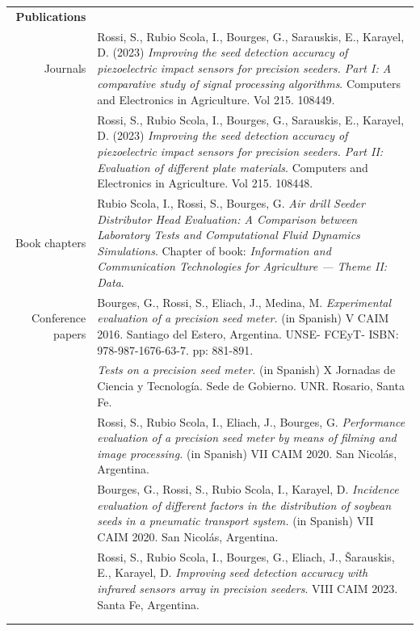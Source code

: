 \documentclass[a4paper,10pt, sans]{article}
\begin{document}
\begin{table}[H]
\begin{tabularx}{\textwidth}{r X}
    \textbf{Publications} & {}\\ [1ex]
      {Journals} & {Rossi, S., Rubio Scola, I., Bourges, G., Sarauskis, E., Karayel, D. (2023) \textit{Improving the seed detection accuracy of piezoelectric impact sensors for
precision seeders. Part I: A comparative study of signal processing algorithms}. Computers and Electronics in Agriculture. Vol 215. 108449.} \\ [1ex]
      {} & {Rossi, S., Rubio Scola, I., Bourges, G., Sarauskis, E., Karayel, D. (2023) \textit{Improving the seed detection accuracy of piezoelectric impact sensors for precision seeders. Part II: Evaluation of different plate materials}. Computers and Electronics in Agriculture. Vol 215. 108448.} \\ 
      {Book chapters} & {Rubio Scola, I., Rossi, S., Bourges, G. \textit{Air drill Seeder Distributor Head Evaluation: A Comparison between Laboratory Tests and Computational Fluid Dynamics
Simulations}. Chapter of book: \textit{Information and Communication Technologies for Agriculture — Theme II: Data}.} \\
      {Conference papers} & Bourges, G., Rossi, S., Eliach, J., Medina, M. \textit{Experimental evaluation of a precision seed meter.} (in Spanish) V CAIM 2016. Santiago del Estero, Argentina. UNSE- FCEyT- ISBN: 978-987-1676-63-7. pp: 881-891. \\  [1ex]
      {} & \textit{Tests on a precision seed meter.} (in Spanish) X Jornadas de Ciencia y Tecnología. Sede de Gobierno. UNR. Rosario, Santa Fe. \\  [1ex]
      {} & Rossi, S., Rubio Scola, I., Eliach, J., Bourges, G. \textit{Performance evaluation of a precision seed meter by means of filming and image processing.} (in Spanish) VII CAIM 2020. San Nicolás, Argentina. \\  [1ex]
      {} & Bourges, G., Rossi, S., Rubio Scola, I., Karayel, D. \textit{Incidence evaluation of different factors in the distribution of soybean seeds in a pneumatic transport system.} (in Spanish)  VII CAIM 2020. San Nicolás, Argentina.  \\  [1ex]
      {} & {Rossi, S., Rubio Scola, I., Bourges, G., Eliach, J., Šarauskis, E., Karayel, D. \textit{Improving seed detection accuracy with infrared sensors array in precision seeders}. VIII CAIM 2023. Santa Fe, Argentina.} \\ \\ \hline \\
    
    
    

\end{tabularx}
\end{table}
\end{document}
